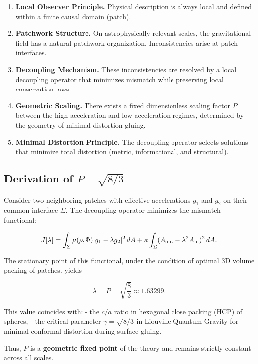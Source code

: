 \documentclass[12pt,a4paper]{article}
\begin{document}
\begin{enumerate}
\item \textbf{Local Observer Principle.} Physical description is always local and defined within a finite causal domain (patch).
\item \textbf{Patchwork Structure.} On astrophysically relevant scales, the gravitational field has a natural patchwork organization. Inconsistencies arise at patch interfaces.
\item \textbf{Decoupling Mechanism.} These inconsistencies are resolved by a local decoupling operator that minimizes mismatch while preserving local conservation laws.
\item \textbf{Geometric Scaling.} There exists a fixed dimensionless scaling factor $P$ between the high-acceleration and low-acceleration regimes, determined by the geometry of minimal-distortion gluing.
\item \textbf{Minimal Distortion Principle.} The decoupling operator selects solutions that minimize total distortion (metric, informational, and structural).
\end{enumerate}

\subsection{Derivation of \( P = \sqrt{8/3} \)}

Consider two neighboring patches with effective accelerations $g_1$ and $g_2$ on their common interface $\Sigma$. The decoupling operator minimizes the mismatch functional:

\begin{equation}
J[\lambda] = \int_{\Sigma} \mu(\rho,\Phi) |g_1 - \lambda g_2|^2 \, dA 
+ \kappa \int_{\Sigma} (A_{\rm out} - \lambda^2 A_{\rm in})^2 \, dA.
\end{equation}

The stationary point of this functional, under the condition of optimal 3D volume packing of patches, yields

\[
\lambda = P = \sqrt{\frac{8}{3}} \approx 1.63299.
\]

This value coincides with:
- the $c/a$ ratio in hexagonal close packing (HCP) of spheres,
- the critical parameter $\gamma = \sqrt{8/3}$ in Liouville Quantum Gravity for minimal conformal distortion during surface gluing.

Thus, $P$ is a \textbf{geometric fixed point} of the theory and remains strictly constant across all scales.
\end{document}
